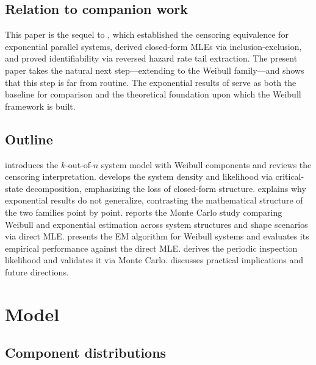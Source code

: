 \documentclass[12pt]{article}
\theoremstyle{definition}
\theoremstyle{remark}
\begin{document}
\subsection*{Relation to companion work}

This paper is the sequel to \citet{Towell2026}, which established
the censoring equivalence for exponential parallel systems, derived
closed-form MLEs via inclusion-exclusion, and proved
identifiability via reversed hazard rate tail extraction.  The
present paper takes the natural next step---extending to the
Weibull family---and shows that this step is far from routine.  The
exponential results of \citet{Towell2026} serve as both the
baseline for comparison and the theoretical foundation upon which
the Weibull framework is built.

\subsection*{Outline}

 introduces the $k$-out-of-$n$ system model with
Weibull components and reviews the censoring interpretation.
 develops the system density and likelihood
via critical-state decomposition, emphasizing the loss of
closed-form structure.
 explains why exponential results do not
generalize, contrasting the mathematical structure of the two
families point by point.
 reports the Monte Carlo study comparing
Weibull and exponential estimation across system structures and
shape scenarios via direct MLE.
 presents the EM algorithm for Weibull
systems and  evaluates its empirical
performance against the direct MLE.
 derives the periodic inspection likelihood
and  validates it via Monte Carlo.
 discusses practical implications and future
directions.


\section{Model}
\label{sec:model}

\subsection{Component distributions}
\end{document}
